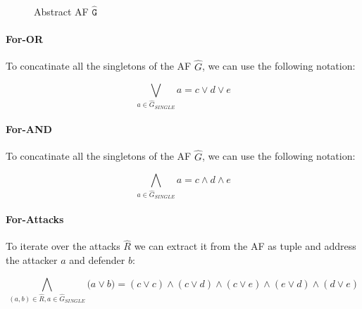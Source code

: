 \begin{figure}[h]
    \centering
    \caption{Abstract AF $\mathtt{\hat{G}}$}
    \label{af:backgroundSATExample1}
\end{figure}


\paragraph{For-OR} To concatinate all the singletons of the AF $\hat{G}$, we can use the following notation:

$$
\bigvee_{a \in \hat{G}_{\!S\!I\!N\!G\!L\!E}} a = c \lor d \lor e
$$

\paragraph{For-AND} To concatinate all the singletons of the AF $\hat{G}$, we can use the following notation:

$$
\bigwedge_{a \in \hat{G}_{\!S\!I\!N\!G\!L\!E}} a = c \land d \land e
$$

\paragraph{For-Attacks} To iterate over the attacks $\hat{R}$ we can extract it from the AF as tuple and address the attacker $a$ and defender $b$:

$$
\bigwedge_{(a, b) \in \hat{R}, a\in \hat{G}_{\!S\!I\!N\!G\!L\!E}} \big( a \lor b \big) = (c \lor c) \land
(c \lor d) \land (c \lor e) \land (e \lor d) \land (d \lor e)
$$